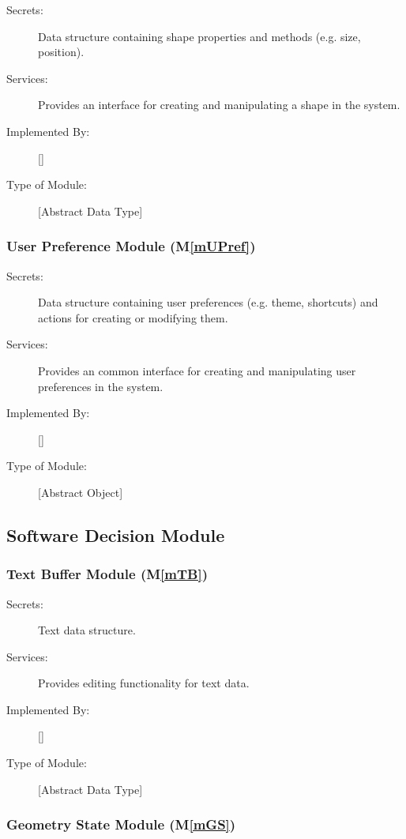 \documentclass[12pt, titlepage]{article}
\newcommand{\mref}[1]{M\ref{#1}}
\begin{document}
\begin{description}
  \item[Secrets:]Data structure containing shape properties and methods (e.g. size, position).
\item[Services:] Provides an interface for creating and manipulating a shape in the system.
\item[Implemented By:] [\progname{}]
\item[Type of Module:] [Abstract Data Type]
\end{description}

\subsubsection{User Preference Module (\mref{mUPref})}

\begin{description}
  \item[Secrets:]Data structure containing user preferences (e.g. theme, shortcuts) and actions for creating or modifying them.
\item[Services:] Provides an common interface for creating and manipulating user preferences in the system.
\item[Implemented By:] [\progname{}]
\item[Type of Module:] [Abstract Object]
\end{description}

\subsection{Software Decision Module}

\subsubsection{Text Buffer Module (\mref{mTB})}

\begin{description}
\item[Secrets:]Text data structure.
\item[Services:]Provides editing functionality for text data.
\item[Implemented By:] [\progname{}]
\item[Type of Module:] [Abstract Data Type]
\end{description}

\subsubsection{Geometry State Module (\mref{mGS})}
\end{document}
